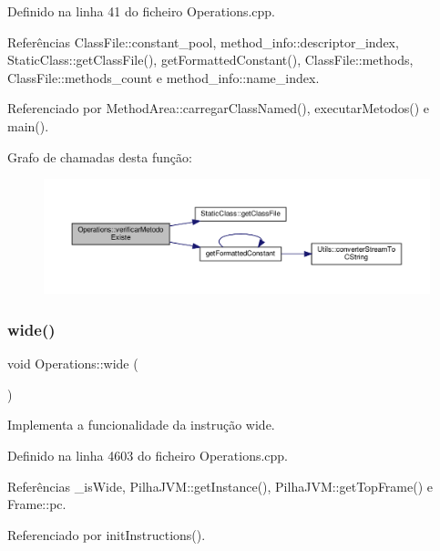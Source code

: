 Definido na linha 41 do ficheiro Operations.\+cpp.



Referências Class\+File\+::constant\+\_\+pool, method\+\_\+info\+::descriptor\+\_\+index, Static\+Class\+::get\+Class\+File(), get\+Formatted\+Constant(), Class\+File\+::methods, Class\+File\+::methods\+\_\+count e method\+\_\+info\+::name\+\_\+index.



Referenciado por Method\+Area\+::carregar\+Class\+Named(), executar\+Metodos() e main().

Grafo de chamadas desta função\+:
\nopagebreak
\begin{figure}[H]
\begin{center}
\leavevmode
\includegraphics[width=350pt]{classOperations_a397caddc1ff805c556d3b71c9e525e3f_cgraph}
\end{center}
\end{figure}
\mbox{\label{classOperations_ab1474dfc4eb5142361b00d185f0a4a2b}} 
\subsubsection{\texorpdfstring{wide()}{wide()}}
{\footnotesize\ttfamily void Operations\+::wide (\begin{DoxyParamCaption}{ }\end{DoxyParamCaption})\hspace{0.3cm}{\ttfamily [private]}}



Implementa a funcionalidade da instrução wide. 



Definido na linha 4603 do ficheiro Operations.\+cpp.



Referências \+\_\+is\+Wide, Pilha\+J\+V\+M\+::get\+Instance(), Pilha\+J\+V\+M\+::get\+Top\+Frame() e Frame\+::pc.



Referenciado por init\+Instructions().

